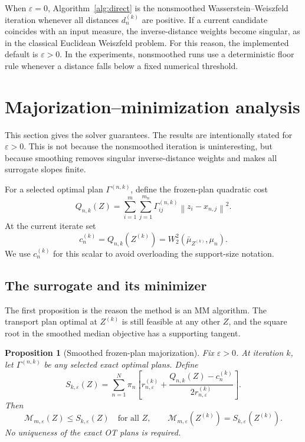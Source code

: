 \documentclass[pdflatex,sn-mathphys-ay]{sn-jnl}%
\theoremstyle{thmstyleone}%
\newtheorem{proposition}[theorem]{Proposition}%
\theoremstyle{thmstyletwo}%
\theoremstyle{thmstylethree}%
\newcommand{\calM}{\mathcal M}
\newcommand{\eps}{\varepsilon}
\newcommand{\barmu}{\bar\mu}
\newcommand{\norm}[1]{\left\lVert #1\right\rVert}
\begin{document}
When \(\eps=0\), Algorithm~\ref{alg:direct} is the nonsmoothed Wasserstein--Weiszfeld iteration whenever all distances \(d_n^{(k)}\) are positive. If a current candidate coincides with an input measure, the inverse-distance weights become singular, as in the classical Euclidean Weiszfeld problem. For this reason, the implemented default is \(\eps>0\). In the experiments, nonsmoothed runs use a deterministic floor rule whenever a distance falls below a fixed numerical threshold.




\section{Majorization--minimization analysis}\label{sec:theory}

This section gives the solver guarantees. The results are intentionally stated for \(\eps>0\). This is not because the nonsmoothed iteration is uninteresting, but because smoothing removes singular inverse-distance weights and makes all surrogate slopes finite.

For a selected optimal plan \(\Gamma^{(n,k)}\), define the frozen-plan quadratic cost
\begin{equation}\label{eq:Qnk}
    Q_{n,k}(Z)=
    \sum_{i=1}^m\sum_{j=1}^{m_n}
    \Gamma_{ij}^{(n,k)}\norm{z_i-x_{n,j}}^2.
\end{equation}
At the current iterate set
\begin{equation}\label{eq:cnk}
    c_n^{(k)}=Q_{n,k}(Z^{(k)})=W_2^2(\barmu_{Z^{(k)}},\mu_n).
\end{equation}
We use \(c_n^{(k)}\) for this scalar to avoid overloading the support-size notation.

\subsection{The surrogate and its minimizer}

The first proposition is the reason the method is an MM algorithm. The transport plan optimal at \(Z^{(k)}\) is still feasible at any other \(Z\), and the square root in the smoothed median objective has a supporting tangent.

\begin{proposition}[Smoothed frozen-plan majorization]\label{prop:majorization}
Fix \(\eps>0\). At iteration \(k\), let \(\Gamma^{(n,k)}\) be any selected exact optimal plans. Define
\begin{equation}\label{eq:surrogate}
    S_{k,\eps}(Z)=
    \sum_{n=1}^N \pi_n
    \left[
    r_{n,\eps}^{(k)}+
    \frac{Q_{n,k}(Z)-c_n^{(k)}}{2r_{n,\eps}^{(k)}}
    \right].
\end{equation}
Then
\[
    \calM_{m,\eps}(Z)\le S_{k,\eps}(Z)
    \quad\text{for all }Z,
    \qquad
    \calM_{m,\eps}(Z^{(k)})=S_{k,\eps}(Z^{(k)}).
\]
No uniqueness of the exact OT plans is required.
\end{proposition}
\end{document}
